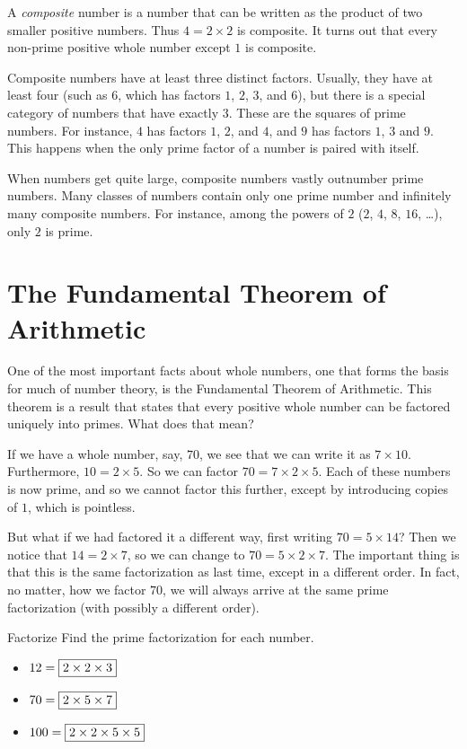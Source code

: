 \documentclass[a4paper,10pt]{report}
\begin{document}
A \emph{composite} number is a number that can be written as the product of two
smaller positive numbers. Thus $4=2\times2$ is composite. It turns out that
every non-prime positive whole number except $1$ is composite.

Composite numbers have at least three distinct factors. Usually, they have at
least four (such as $6$, which has factors $1$, $2$, $3$, and $6$), but there is
a special category of numbers that have exactly $3$. These are the squares of
prime numbers. For instance, $4$ has factors $1$, $2$, and $4$, and $9$ has
factors $1$, $3$ and $9$. This happens when the only prime factor of a number is
paired with itself.

When numbers get quite large, composite numbers vastly outnumber prime numbers.
Many classes of numbers contain only one prime number and infinitely many
composite numbers. For instance, among the powers of $2$ ($2$, $4$, $8$, $16$,
\dots), only $2$ is prime.

\section{The Fundamental Theorem of Arithmetic}

One of the most important facts about whole numbers, one that forms the basis
for much of number theory, is the Fundamental Theorem of Arithmetic. This
theorem is a result that states that every positive whole number can be factored
uniquely into primes. What does that mean?

If we have a whole number, say, $70$, we see that we can write it as
$7\times10$. Furthermore, $10=2\times5$. So we can factor $70=7\times2\times5$.
Each of these numbers is now prime, and so we cannot factor this further, except
by introducing copies of $1$, which is pointless.

But what if we had factored it a different way, first writing $70=5\times14$?
Then we notice that $14=2\times7$, so we can change to $70=5\times2\times7$. The
important thing is that this is the same factorization as last time, except in a
different order. In fact, no matter, how we factor $70$, we will always arrive
at the same prime factorization (with possibly a different order).

\begin{problem}{Factorize}
 Find the prime factorization for each number.

 \begin{itemize}
  \item $12 = \Ans{2\times2\times3}$
  \item $70 = \Ans{2\times5\times7}$
  \item $100 = \Ans{2\times2\times5\times5}$
 \end{itemize}
\end{problem}
\end{document}
